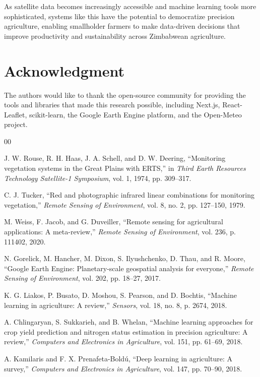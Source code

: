 \documentclass[journal]{IEEEtran}
\begin{document}
As satellite data becomes increasingly accessible and machine learning tools more sophisticated, systems like this have the potential to democratize precision agriculture, enabling smallholder farmers to make data-driven decisions that improve productivity and sustainability across Zimbabwean agriculture.

\section*{Acknowledgment}

The authors would like to thank the open-source community for providing the tools and libraries that made this research possible, including Next.js, React-Leaflet, scikit-learn, the Google Earth Engine platform, and the Open-Meteo project.

\begin{thebibliography}{00}

 J. W. Rouse, R. H. Haas, J. A. Schell, and D. W. Deering, ``Monitoring vegetation systems in the Great Plains with ERTS,'' in \textit{Third Earth Resources Technology Satellite-1 Symposium}, vol. 1, 1974, pp. 309--317.

 C. J. Tucker, ``Red and photographic infrared linear combinations for monitoring vegetation,'' \textit{Remote Sensing of Environment}, vol. 8, no. 2, pp. 127--150, 1979.

 M. Weiss, F. Jacob, and G. Duveiller, ``Remote sensing for agricultural applications: A meta-review,'' \textit{Remote Sensing of Environment}, vol. 236, p. 111402, 2020.

 N. Gorelick, M. Hancher, M. Dixon, S. Ilyushchenko, D. Thau, and R. Moore, ``Google Earth Engine: Planetary-scale geospatial analysis for everyone,'' \textit{Remote Sensing of Environment}, vol. 202, pp. 18--27, 2017.

 K. G. Liakos, P. Busato, D. Moshou, S. Pearson, and D. Bochtis, ``Machine learning in agriculture: A review,'' \textit{Sensors}, vol. 18, no. 8, p. 2674, 2018.

 A. Chlingaryan, S. Sukkarieh, and B. Whelan, ``Machine learning approaches for crop yield prediction and nitrogen status estimation in precision agriculture: A review,'' \textit{Computers and Electronics in Agriculture}, vol. 151, pp. 61--69, 2018.

 A. Kamilaris and F. X. Prenafeta-Boldú, ``Deep learning in agriculture: A survey,'' \textit{Computers and Electronics in Agriculture}, vol. 147, pp. 70--90, 2018.


\end{thebibliography}
\end{document}
